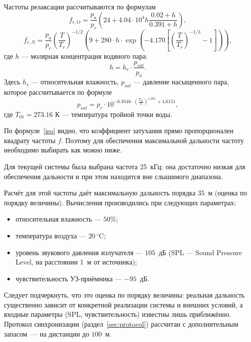 Частоты релаксации рассчитываются по формулам
\begin{equation}
f_{r,O} = \frac{p_a}{p_r} \left( 24 + 4.04 \cdot 10^{4} h \frac{0.02 + h}{0.391 + h} \right),
\end{equation}
\begin{equation}
f_{r,N} = \frac{p_a}{p_r} \left( \frac{T}{T_r} \right)^{-1/2} \left( 9 + 280 \cdot h \cdot \exp \left( -4.170 \left[ \left(\frac{T}{T_r}\right)^{-1/3} - 1 \right] \right) \right),
\end{equation}
где $h$ — молярная концентрация водяного пара:
\begin{equation}
h = h_r \cdot \frac{p_{sat}}{p_a}.
\end{equation}
Здесь $h_r$ — относительная влажность, $p_{sat}$ — давление насыщенного пара, которое рассчитывается по формуле
\begin{equation}
p_{sat} = p_r \cdot 10^{-6.8346 \cdot \left( \frac{T_{01}}{T} \right)^{1.261} + 4.6151},
\end{equation}
где $T_{01} = 273.16$ К — температура тройной точки воды.

По формуле~\eqref{iso} видно, что коэффициент затухания прямо пропорционален
квадрату частоты $f$. Поэтому для обеспечения максимальной дальности частоту
необходимо выбирать как можно ниже.

Для текущей системы была выбрана частота 25~кГц: она достаточно низкая для
обеспечения дальности и при этом находится вне слышимого диапазона.

Расчёт для этой частоты даёт максимальную дальность порядка $35$~м (оценка по порядку величины).
Вычисления производились при следующих параметрах:
\begin{itemize}
\item относительная влажность --- $50\%$;
\item температура воздуха --- $20\,^\circ\mathrm{C}$;
\item уровень звукового давления излучателя --- $105$~дБ (SPL --- Sound Pressure Level, на расстоянии 1~м от источника);
\item чувствительность УЗ-приёмника --- $-95$~дБ.
\end{itemize}

Следует подчеркнуть, что это оценка по порядку величины: реальная дальность
существенно зависит от конкретной реализации системы и внешних условий, а входные
параметры (SPL, чувствительность) известны лишь приближённо.
Протокол синхронизации (раздел~\ref{sec:protocol}) рассчитан с дополнительным
запасом~--- на дистанции до $100$~м.

